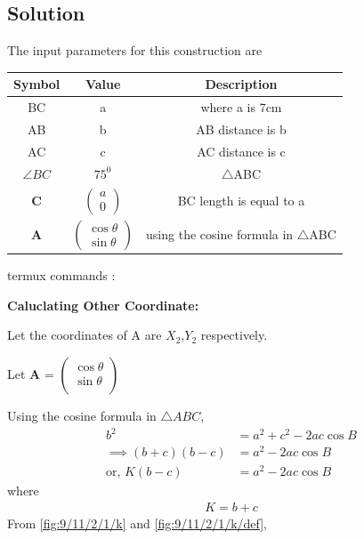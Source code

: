 \documentclass[10pt,a4paper]{report}
\newcommand{\myvec}[1]{\ensuremath{\begin{pmatrix}#1\end{pmatrix}}}
\let\vec\mathbf
\begin{document}
\begin{multicols}{2}
\section{Solution}
The input parameters for this construction are
\begin{center}
\begin{tabular}{|c|c|c|}
	\hline
	\textbf{Symbol}&\textbf{Value}&\textbf{Description}\\
	\hline
	BC & a & where a is 7cm\\
	\hline
	AB & b & AB distance is b \\
	\hline 
	AC & c & AC distance is c \\
	\hline
	$\angle{BC}$ & $75^0$ &  $\triangle$ABC \\
	\hline
	$\vec{C}$ & $\myvec{a\\0}$ & BC length is equal to a\\
	\hline
	$\vec{A}$ & $\myvec{ \cos\theta \\ \sin\theta}$ & using the cosine formula in $\triangle$ABC\\
	\hline
\end{tabular}
\end{center}
\raggedright {termux commands :}
\begin{center}
\end{center}
\raggedright\textbf{Caluclating Other Coordinate: } \\
\raggedright Let the coordinates of A are $X_{2}$,$Y_{2}$ respectively. \\
  \raggedright Let \textbf{A} =
  $\begin{pmatrix} 
 \cos \theta\\
  \sin\theta \\
\end{pmatrix}$ \\
\raggedright 
\fi
	Using the cosine formula in  $\triangle ABC$,
\begin{align}
	{b}^2&= {a}^2 + {c}^2 - 2ac\cos{B}
\\
\implies	(b+c)(b-c) &= {a}^2- 2  a  c\cos{B}
\\
	\text{or, }K(b-c) &= {a}^2- 2  a  c\cos{B}
		\label{fig:9/11/2/1/k}
\end{align}
%
where
\begin{align}
K = b+c 
		\label{fig:9/11/2/1/k/def}
\end{align}
From 
		\eqref{fig:9/11/2/1/k}
		and
		\eqref{fig:9/11/2/1/k/def},
\begin{align}

\end{align}
\end{multicols}
\end{document}
